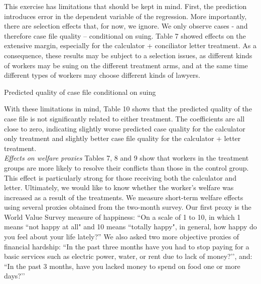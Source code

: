 \documentclass[oneside,12pt]{article}
\begin{document}
This exercise has limitations that should be kept in mind. First, the prediction introduces error in the dependent variable of the regression. More importantly, there are selection effects that, for now, we ignore. We only observe cases - and therefore case file quality – conditional on suing. Table 7 showed effects on the extensive margin, especially for the calculator + conciliator letter treatment. As a consequence, these results may be subject to a selection issues, as different kinds of workers may be suing on the different treatment arms, and at the same time different types of workers may choose different kinds of lawyers.
\\
\begin{table}[!ht]
    \caption{Predicted quality of case file conditional on suing} 
    \label{tab:10_TE_quality_postlasso}
    \center
    \scriptsize{}
  
\end{table}


With these limitations in mind, Table 10 shows that the predicted quality of the case file is not significantly related to either treatment. The coefficients are all close to zero, indicating slightly worse predicted case quality for the calculator only treatment and slightly better case file quality for the calculator + letter treatment.
\\

\noindent\emph{Effects on welfare proxies}
Tables 7, 8 and 9 show that workers in the treatment groups are more likely to resolve their conflicts than those in the control group. This effect is particularly strong for those receiving both the calculator and letter. Ultimately, we would like to know whether the worker’s welfare was increased as a result of the treatments. We measure short-term welfare effects using several proxies obtained from the two-month survey. Our first proxy is the World Value Survey measure of happiness: “On a scale of 1 to 10, in which 1 means “not happy at all" and 10 means “totally happy", in general, how happy do you feel about your life lately?” We also asked two more objective proxies of financial hardship: “In the past three months have you had to stop paying for a basic services such as electric power, water, or rent due to lack of money?’’, and: “In the past 3 months, have you lacked money to spend on food one or more days?’’ 
\end{document}
